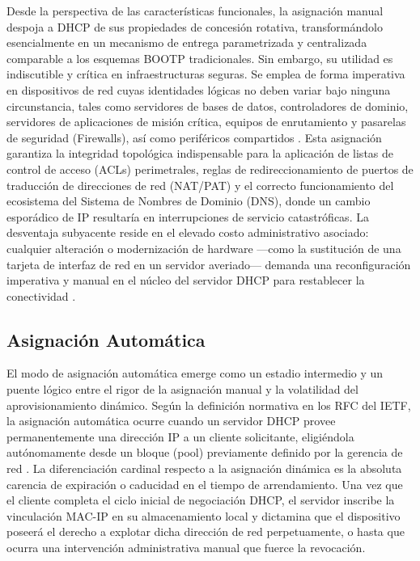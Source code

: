 \documentclass[a4paper,12pt]{article}
\begin{document}
Desde la perspectiva de las características funcionales, la asignación manual despoja a DHCP de sus propiedades de concesión rotativa, transformándolo esencialmente en un mecanismo de entrega parametrizada y centralizada comparable a los esquemas BOOTP tradicionales. Sin embargo, su utilidad es indiscutible y crítica en infraestructuras seguras. Se emplea de forma imperativa en dispositivos de red cuyas identidades lógicas no deben variar bajo ninguna circunstancia, tales como servidores de bases de datos, controladores de dominio, servidores de aplicaciones de misión crítica, equipos de enrutamiento y pasarelas de seguridad (Firewalls), así como periféricos compartidos \cite{ionos_dhcp_config, akamai_dhcp}. Esta asignación garantiza la integridad topológica indispensable para la aplicación de listas de control de acceso (ACLs) perimetrales, reglas de redireccionamiento de puertos de traducción de direcciones de red (NAT/PAT) y el correcto funcionamiento del ecosistema del Sistema de Nombres de Dominio (DNS), donde un cambio esporádico de IP resultaría en interrupciones de servicio catastróficas. La desventaja subyacente reside en el elevado costo administrativo asociado: cualquier alteración o modernización de hardware —como la sustitución de una tarjeta de interfaz de red en un servidor averiado— demanda una reconfiguración imperativa y manual en el núcleo del servidor DHCP para restablecer la conectividad \cite{lightyear_bootp_dhcp}.

\subsection*{Asignación Automática}
El modo de asignación automática emerge como un estadio intermedio y un puente lógico entre el rigor de la asignación manual y la volatilidad del aprovisionamiento dinámico. Según la definición normativa en los RFC del IETF, la asignación automática ocurre cuando un servidor DHCP provee permanentemente una dirección IP a un cliente solicitante, eligiéndola autónomamente desde un bloque (pool) previamente definido por la gerencia de red \cite{rfc2131, cisco_dhcp, paloalto_dhcp}. La diferenciación cardinal respecto a la asignación dinámica es la absoluta carencia de expiración o caducidad en el tiempo de arrendamiento. Una vez que el cliente completa el ciclo inicial de negociación DHCP, el servidor inscribe la vinculación MAC-IP en su almacenamiento local y dictamina que el dispositivo poseerá el derecho a explotar dicha dirección de red perpetuamente, o hasta que ocurra una intervención administrativa manual que fuerce la revocación.
\end{document}
